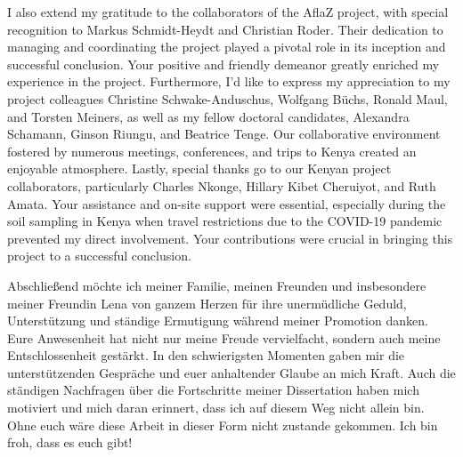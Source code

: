 \begin{acknowledgements}
I also extend my gratitude to the collaborators of the AflaZ project, with special recognition to Markus Schmidt-Heydt and Christian Roder. Their dedication to managing and coordinating the project played a pivotal role in its inception and successful conclusion. Your positive and friendly demeanor greatly enriched my experience in the project. Furthermore, I'd like to express my appreciation to my project colleagues Christine Schwake-Anduschus, Wolfgang Büchs, Ronald Maul, and Torsten Meiners, as well as my fellow doctoral candidates, Alexandra Schamann, Ginson Riungu, and Beatrice Tenge. Our collaborative environment fostered by numerous meetings, conferences, and trips to Kenya created an enjoyable atmosphere. Lastly, special thanks go to our Kenyan project collaborators, particularly Charles Nkonge, Hillary Kibet Cheruiyot, and Ruth Amata. Your assistance and on-site support were essential, especially during the soil sampling in Kenya when travel restrictions due to the COVID-19 pandemic prevented my direct involvement. Your contributions were crucial in bringing this project to a successful conclusion.


Abschließend möchte ich meiner Familie, meinen Freunden und insbesondere meiner Freundin Lena von ganzem Herzen für ihre unermüdliche Geduld, Unterstützung und ständige Ermutigung während meiner Promotion danken. Eure Anwesenheit hat nicht nur meine Freude vervielfacht, sondern auch meine Entschlossenheit gestärkt. In den schwierigsten Momenten gaben mir die unterstützenden Gespräche und euer anhaltender Glaube an mich Kraft. Auch die ständigen Nachfragen über die Fortschritte meiner Dissertation haben mich motiviert und mich daran erinnert, dass ich auf diesem Weg nicht allein bin. Ohne euch wäre diese Arbeit in dieser Form nicht zustande gekommen. Ich bin froh, dass es euch gibt!


\end{acknowledgements}